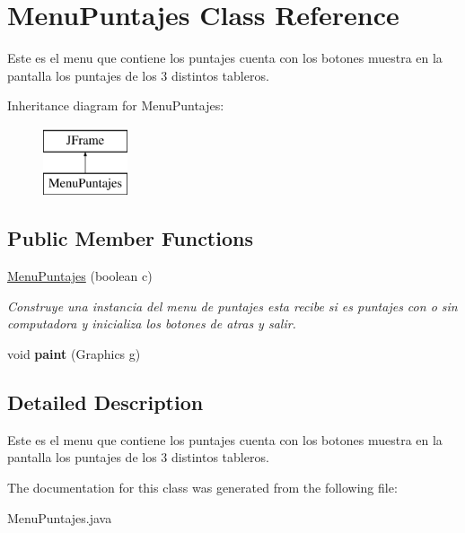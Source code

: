 \hypertarget{class_menu_puntajes}{}\section{Menu\+Puntajes Class Reference}
\label{class_menu_puntajes}


Este es el menu que contiene los puntajes cuenta con los botones muestra en la pantalla los puntajes de los 3 distintos tableros.  


Inheritance diagram for Menu\+Puntajes\+:\begin{figure}[H]
\begin{center}
\leavevmode
\includegraphics[height=2.000000cm]{class_menu_puntajes}
\end{center}
\end{figure}
\subsection*{Public Member Functions}
\begin{DoxyCompactItemize}
\item 
\mbox{\label{class_menu_puntajes_a55f14c668188169b727ab70886036b7c}} 
\mbox{\hyperlink{class_menu_puntajes_a55f14c668188169b727ab70886036b7c}{Menu\+Puntajes}} (boolean c)
\begin{DoxyCompactList}\small\item\em Construye una instancia del menu de puntajes esta recibe si es puntajes con o sin computadora y inicializa los botones de atras y salir. \end{DoxyCompactList}\item 
\mbox{\label{class_menu_puntajes_a89979e9e1e546e1ae028d860ed19d754}} 
void {\bfseries paint} (Graphics g)
\end{DoxyCompactItemize}


\subsection{Detailed Description}
Este es el menu que contiene los puntajes cuenta con los botones muestra en la pantalla los puntajes de los 3 distintos tableros. 

The documentation for this class was generated from the following file\+:\begin{DoxyCompactItemize}
\item 
Menu\+Puntajes.\+java\end{DoxyCompactItemize}
